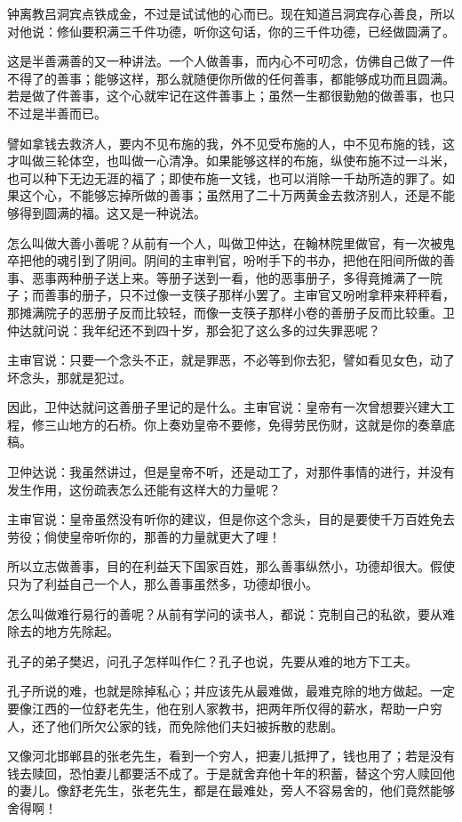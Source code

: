 \documentclass[12pt,twoside,openany]{book}
\begin{document}
钟离教吕洞宾点铁成金，不过是试试他的心而已。现在知道吕洞宾存心善良，所以对他说：修仙要积满三千件功德，听你这句话，你的三千件功德，已经做圆满了。

这是半善满善的又一种讲法。一个人做善事，而内心不可叨念，仿佛自己做了一件不得了的善事；能够这样，那么就随便你所做的任何善事，都能够成功而且圆满。若是做了件善事，这个心就牢记在这件善事上；虽然一生都很勤勉的做善事，也只不过是半善而已。

譬如拿钱去救济人，要内不见布施的我，外不见受布施的人，中不见布施的钱，这才叫做三轮体空，也叫做一心清净。如果能够这样的布施，纵使布施不过一斗米，也可以种下无边无涯的福了；即使布施一文钱，也可以消除一千劫所造的罪了。如果这个心，不能够忘掉所做的善事；虽然用了二十万两黄金去救济别人，还是不能够得到圆满的福。这又是一种说法。

怎么叫做大善小善呢？从前有一个人，叫做卫仲达，在翰林院里做官，有一次被鬼卒把他的魂引到了阴间。阴间的主审判官，吩咐手下的书办，把他在阳间所做的善事、恶事两种册子送上来。等册子送到一看，他的恶事册子，多得竟摊满了一院子；而善事的册子，只不过像一支筷子那样小罢了。主审官又吩咐拿秤来秤秤看，那摊满院子的恶册子反而比较轻，而像一支筷子那样小卷的善册子反而比较重。卫仲达就问说：我年纪还不到四十岁，那会犯了这么多的过失罪恶呢？

主审官说：只要一个念头不正，就是罪恶，不必等到你去犯，譬如看见女色，动了坏念头，那就是犯过。

因此，卫仲达就问这善册子里记的是什么。主审官说：皇帝有一次曾想要兴建大工程，修三山地方的石桥。你上奏劝皇帝不要修，免得劳民伤财，这就是你的奏章底稿。

卫仲达说：我虽然讲过，但是皇帝不听，还是动工了，对那件事情的进行，并没有发生作用，这份疏表怎么还能有这样大的力量呢？

主审官说：皇帝虽然没有听你的建议，但是你这个念头，目的是要使千万百姓免去劳役；倘使皇帝听你的，那善的力量就更大了哩！

所以立志做善事，目的在利益天下国家百姓，那么善事纵然小，功德却很大。假使只为了利益自己一个人，那么善事虽然多，功德却很小。

怎么叫做难行易行的善呢？从前有学问的读书人，都说：克制自己的私欲，要从难除去的地方先除起。

孔子的弟子樊迟，问孔子怎样叫作仁？孔子也说，先要从难的地方下工夫。

孔子所说的难，也就是除掉私心；并应该先从最难做，最难克除的地方做起。一定要像江西的一位舒老先生，他在别人家教书，把两年所仅得的薪水，帮助一户穷人，还了他们所欠公家的钱，而免除他们夫妇被拆散的悲剧。

又像河北邯郸县的张老先生，看到一个穷人，把妻儿抵押了，钱也用了；若是没有钱去赎回，恐怕妻儿都要活不成了。于是就舍弃他十年的积蓄，替这个穷人赎回他的妻儿。像舒老先生，张老先生，都是在最难处，旁人不容易舍的，他们竟然能够舍得啊！
\end{document}
